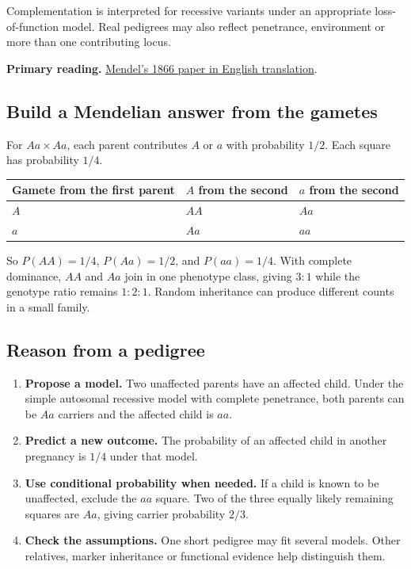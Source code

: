 \documentclass[12pt,a4paper]{article}
\begin{document}
\begin{tcolorbox}[masonbox, title={Use the assumptions}]
Complementation is interpreted for recessive variants under an appropriate loss-of-function model. Real pedigrees may also reflect penetrance, environment or more than one contributing locus.
\end{tcolorbox}

\textbf{Primary reading.} \href{https://doi.org/10.1534/genetics.116.195198}{Mendel's 1866 paper in English translation}.

\subsection{Build a Mendelian answer from the gametes}
\begin{tcolorbox}[examplebox, title={Read a Punnett square and account for each outcome}]
For $Aa\times Aa$, each parent contributes $A$ or $a$ with probability $1/2$. Each square has probability $1/4$.
\par\vspace{6pt}
\noindent\begin{tabularx}{\linewidth}{|B{3.5cm}|Y|Y|}
\hline
\textbf{Gamete from the first parent} & \textbf{$A$ from the second} & \textbf{$a$ from the second} \\ \hline
$A$ & $AA$ & $Aa$ \\ \hline
$a$ & $Aa$ & $aa$ \\ \hline
\end{tabularx}\par\smallskip

So $P(AA)=1/4$, $P(Aa)=1/2$, and $P(aa)=1/4$. With complete dominance, $AA$ and $Aa$ join in one phenotype class, giving $3:1$ while the genotype ratio remains $1:2:1$. Random inheritance can produce different counts in a small family.
\end{tcolorbox}

\subsection{Reason from a pedigree}
\begin{enumerate}[leftmargin=*, itemsep=2pt]
  \item \textbf{Propose a model.} Two unaffected parents have an affected child. Under the simple autosomal recessive model with complete penetrance, both parents can be $Aa$ carriers and the affected child is $aa$.
  \item \textbf{Predict a new outcome.} The probability of an affected child in another pregnancy is $1/4$ under that model.
  \item \textbf{Use conditional probability when needed.} If a child is known to be unaffected, exclude the $aa$ square. Two of the three equally likely remaining squares are $Aa$, giving carrier probability $2/3$.
  \item \textbf{Check the assumptions.} One short pedigree may fit several models. Other relatives, marker inheritance or functional evidence help distinguish them.
\end{enumerate}
\end{document}
